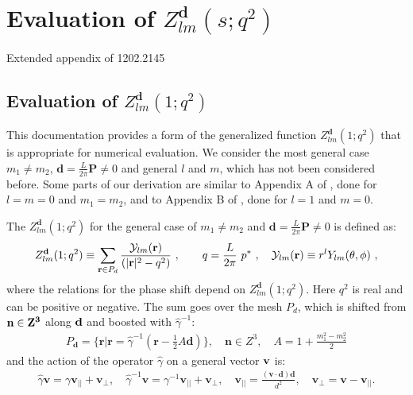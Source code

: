 \documentclass[a4paper,12pt]{book}
\begin{document}
\chapter*{\texorpdfstring{Evaluation of $Z^{\mathbf{d}}_{lm}(s;q^2)$}{Evaluating the generalized Zlm}}
\vspace{-1cm}
Extended appendix of 1202.2145\\
\vspace{-1cm}
\section*{\texorpdfstring{Evaluation of $Z^{\mathbf{d}}_{lm}(1;q^2)$}{Evaluating the generalized Zlm1q2}}

This documentation provides a form of the  generalized function $Z_{lm}^{\mathbf{d}}(1;q^2)$  that is appropriate for numerical evaluation. We consider the most general case $m_1\not = m_2$,  $\mathbf{d}=\tfrac{L}{2\pi}\mathbf{P} \not = 0$ and general $l$ and $m$, which has not been considered before. Some parts of our derivation  are similar to  Appendix A of \cite{Yamazaki:2004qb}, done for $l=m=0$ and $m_1=m_2$, and to  Appendix B of \cite{Fu:2011xz}, done for  $l=1$ and $m=0$. 

The $Z_{lm}^{\mathbf{d}}(1;q^2)$ for the general case of $m_1\not = m_2$ and $\mathbf{d}=\tfrac{L}{2\pi}\mathbf{P} \not = 0$ is defined as:
\begin{equation}
\label{Zlm_def}
Z_{lm}^{\mathbf{d}}(1;q^2)\equiv \sum_{\mathbf{r}\in P_{d}} \frac{{\cal Y}_{lm}(\mathbf{r})}{(|\mathbf{r}|^2-q^2)}\ , \qquad q=\frac{L}{2\pi}~ p^*~,\quad {\cal Y}_{lm}(\mathbf{r})\equiv r^l Y_{lm}(\theta,\phi) \ ,
\end{equation}
where the relations for the phase shift depend on $Z_{lm}^{\mathbf{d}}(1;q^2)$. Here $q^2$ is real and can be positive or negative. The sum goes over the mesh $P_{d}$, which is shifted from $\bf{n} \in Z^3$ along $\bf{d}$ and boosted with $\hat{\gamma}^{-1}$:
\begin{align}
P_{\mathbf{d}} = \{ \mathbf{r} | \mathbf{r}=\hat{\gamma}^{-1}(\mathbf{r}-\frac{1}{2}A \mathbf{d}) \}, \quad \mathbf{n} \in Z^3,\quad A=1+\frac{m_1^2 - m_2^2}{2}
\end{align}
and the action of the operator $\hat{\gamma}$ on a general vector $\bf{v}$ is:
\begin{align}
\hat{\gamma}\mathbf{v}=\gamma \mathbf{v}_{||} + \mathbf{v}_{\bot}, \quad \hat{\gamma}^{-1}\mathbf{v}=\gamma^{-1} \mathbf{v}_{||} + \mathbf{v}_{\bot},\quad \mathbf{v}_{||} = \frac{(\mathbf{v}\cdot\mathbf{d})\mathbf{d}}{d^2}, \quad \mathbf{v}_{\bot}=\mathbf{v} - \mathbf{v}_{||}.
\end{align}
\end{document}
